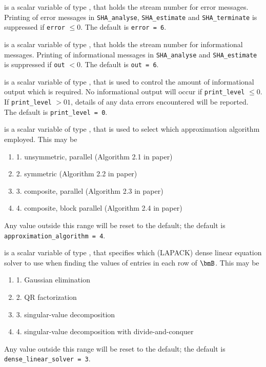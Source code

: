 \documentclass{galahad}
\newcommand{\packagename}{SHA}
\begin{document}
\begin{description}

 is a scalar variable of type \integer, that holds the
stream number for error messages. Printing of error messages in
{\tt \packagename\_analyse},
{\tt \packagename\_estimate}
and {\tt \packagename\_terminate}
is suppressed if {\tt error} $\leq 0$.
The default is {\tt error = 6}.

 is a scalar variable of type \integer, that holds the
stream number for informational messages. Printing of informational messages in
{\tt \packagename\_analyse} and {\tt \packagename\_estimate}
is suppressed if {\tt out} $< 0$.
The default is {\tt out = 6}.

 is a scalar variable of type \integer, that is used
to control the amount of informational output which is required. No
informational output will occur if {\tt print\_level} $\leq 0$. If
{\tt print\_level} $> 01$, details of any data errors encountered
will be reported.
The default is {\tt print\_level = 0}.

 is a scalar variable of type \integer,
that is used to select which approximation algorithm employed. This may be
\begin{enumerate}
\item 1. unsymmetric, parallel (Algorithm 2.1 in paper)
\item 2. symmetric (Algorithm 2.2 in paper)
\item 3. composite, parallel (Algorithm 2.3 in paper)
\item 4. composite, block parallel (Algorithm 2.4 in paper)
\end{enumerate}
Any value outside this range will be reset to the default;
the default is {\tt approximation\_algorithm = 4}.

 is a scalar variable of type \integer,
that specifies which (LAPACK) dense linear equation solver to use when finding
the values of entries in each row of $\bmB$. This may be
\begin{enumerate}
\item 1. Gaussian elimination
\item 2. QR factorization
\item 3. singular-value decomposition
\item 4. singular-value decomposition with divide-and-conquer
\end{enumerate}
Any value outside this range will be reset to the default;
the default is {\tt dense\_linear\_solver = 3}.


\end{description}
\end{document}
